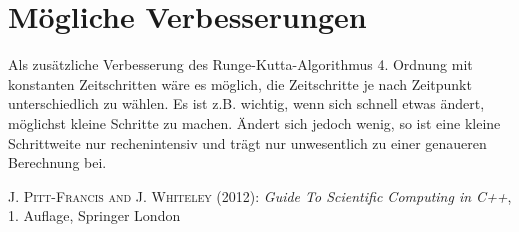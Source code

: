 \documentclass[12pt,a4paper,titlepage,headinclude,bibtotoc]{scrartcl}
\begin{document}
\section{Mögliche Verbesserungen}
Als zusätzliche Verbesserung des Runge-Kutta-Algorithmus 4. Ordnung mit konstanten Zeitschritten wäre es möglich, die Zeitschritte je nach Zeitpunkt unterschiedlich zu wählen.
Es ist z.B. wichtig, wenn sich schnell etwas ändert, möglichst kleine Schritte zu machen.
Ändert sich jedoch wenig, so ist eine kleine Schrittweite nur rechenintensiv und trägt nur unwesentlich zu einer genaueren Berechnung bei.

\begin{thebibliography}{1000}

	\textsc{J. Pitt-Francis and J. Whiteley} (2012): \emph{Guide To Scientific Computing in C++},
	1. Auflage, Springer London

\end{thebibliography}
\end{document}
